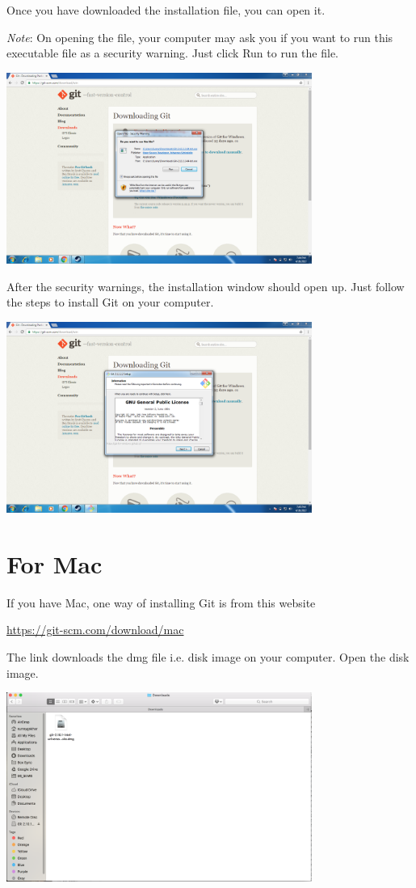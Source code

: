 \documentclass[12pt]{report}
\begin{document}
\noindent
Once you have downloaded the installation file, you can open it. 

\textit{Note}: On opening the file, your computer may ask you if you want to run this executable file as a security warning. Just click Run to run the file.

\includegraphics[width=0.75\textwidth]{security}

After the security warnings, the installation window should open up. Just follow the steps to install Git on your computer.

\includegraphics[width=0.75\textwidth]{windows-install}

\section{For Mac}

If you have Mac, one way of installing Git is from this website

\url{https://git-scm.com/download/mac}

The link downloads the dmg file i.e. disk image on your computer. Open the disk image.

\includegraphics[width=0.75\textwidth]{git-mac-disk}
\end{document}

